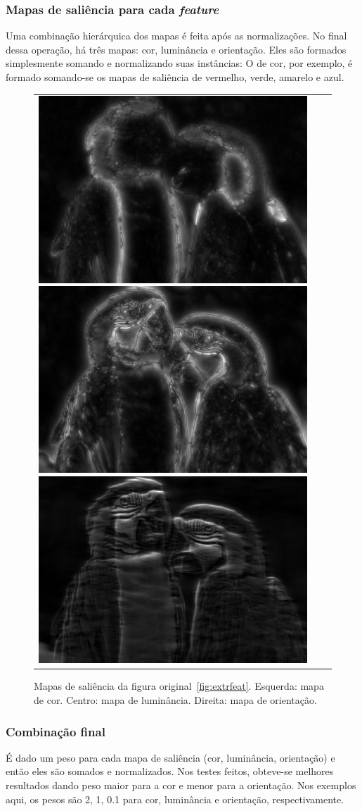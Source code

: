 \documentclass[11pt]{article}
\newcommand{\tit}[1]{\textit{#1}}
\begin{document}
\subsubsection{Mapas de saliência para cada \tit{feature}}
Uma combinação hierárquica dos mapas é feita após as normalizações.
No final dessa operação, há três mapas: cor, luminância
e orientação.
Eles são formados simplesmente somando e normalizando suas instâncias:
O de cor, por exemplo, é formado somando-se os mapas de saliência de
vermelho, verde, amarelo e azul.
\begin{figure}[H]
\begin{center}
		\begin{tabular} {ccc}
            \includegraphics[width=0.3\linewidth]{img/arara_col_map.png}
            \includegraphics[width=0.3\linewidth]{img/arara_cst_map.png}
            \includegraphics[width=0.3\linewidth]{img/arara_ort_map.png}
		\end{tabular}
\end{center}
\caption{Mapas de saliência da figura original~\ref{fig:extrfeat}.
    Esquerda: mapa de cor. Centro: mapa de luminância. Direita: mapa de
orientação.}
\label{fig:maps}
\end{figure}

\subsubsection{Combinação final}
É dado um peso para cada mapa de saliência (cor, luminância, orientação)
e então eles são somados e normalizados. Nos testes feitos, obteve-se
melhores resultados dando peso maior para a cor e menor para a orientação.
Nos exemplos aqui, os pesos são 2, 1, 0.1 para cor, luminância e orientação,
respectivamente.
\end{document}
